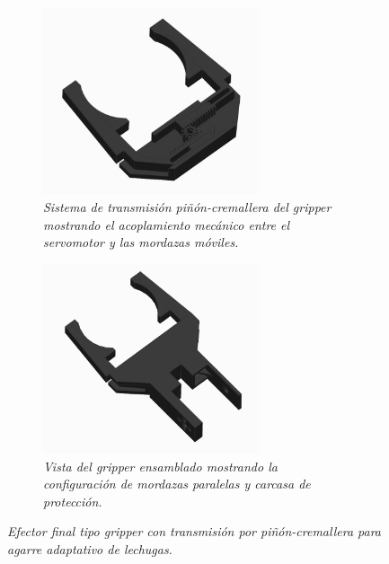 \begin{figure}[H]
    \centering
    \begin{subfigure}{0.35\textwidth}
        \centering
        \includegraphics[width=0.7\textwidth]{img/gripper.jpg}
        \caption{\textit{Sistema de transmisión piñón-cremallera del gripper mostrando el acoplamiento mecánico entre el servomotor y las mordazas móviles.}}
        \label{fig:gripper_Real_transmision}
    \end{subfigure}
    \hspace{0.5cm}
    \begin{subfigure}{0.35\textwidth}
        \centering
        \includegraphics[width=0.7\textwidth]{img/pinza_tapa.png}
        \caption{\textit{Vista del gripper ensamblado mostrando la configuración de mordazas paralelas y carcasa de protección.}}
        \label{fig:gripper_Real}
    \end{subfigure}
    \caption{\textit{Efector final tipo gripper con transmisión por piñón-cremallera para agarre adaptativo de lechugas.}}
\end{figure}

